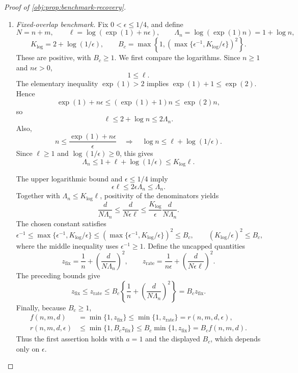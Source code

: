 \documentclass[11pt]{article}
\begin{document}
\begin{proof}[Proof of \cref{obj:prop:benchmark-recovery}]
\begin{enumerate}
\item \emph{Fixed-overlap benchmark.}
Fix \(0<\epsilon\le1/4\), and define
\[
N=n+m,\qquad
\ell=\log(\exp(1)+n\epsilon),\qquad
\Lambda_n=\log(\exp(1)n)=1+\log n,
\]
\[
K_{\log}=2+\log(1/\epsilon),
\qquad
B_c=\max\left\{1,
\left(\max\{\epsilon^{-1},K_{\log}/\epsilon\}\right)^2\right\}.
\]
These are positive, with \(B_c\ge1\). We first compare the logarithms. Since \(n\ge1\) and \(n\epsilon>0\),
\[
1\le\ell.
\]
The elementary inequality \(\exp(1)>2\) implies
\(\exp(1)+1\le\exp(2)\). Hence
\[
\exp(1)+n\epsilon
\le(\exp(1)+1)n
\le\exp(2)n,
\]
so
\[
\ell\le2+\log n\le2\Lambda_n.
\]
Also,
\[
n\le\frac{\exp(1)+n\epsilon}{\epsilon}
\quad\Longrightarrow\quad
\log n\le\ell+\log(1/\epsilon).
\]
Since \(\ell\ge1\) and \(\log(1/\epsilon)\ge0\), this gives
\[
\Lambda_n
\le1+\ell+\log(1/\epsilon)
\le K_{\log}\ell.
\]

The upper logarithmic bound and \(\epsilon\le1/4\) imply
\[
\epsilon\ell\le2\epsilon\Lambda_n\le\Lambda_n.
\]
Together with \(\Lambda_n\le K_{\log}\ell\), positivity of the denominators yields
\[
\frac d{N\Lambda_n}
\le\frac d{N\epsilon\ell}
\le\frac{K_{\log}}{\epsilon}\frac d{N\Lambda_n}.
\]
The chosen constant satisfies
\[
\epsilon^{-1}
\le\max\{\epsilon^{-1},K_{\log}/\epsilon\}
\le\left(\max\{\epsilon^{-1},K_{\log}/\epsilon\}\right)^2
\le B_c,
\qquad
(K_{\log}/\epsilon)^2\le B_c,
\]
where the middle inequality uses \(\epsilon^{-1}\ge1\). Define the uncapped quantities
\[
z_{\mathrm{fix}}
=\frac1n+\left(\frac d{N\Lambda_n}\right)^2,
\qquad
z_{\mathrm{rate}}
=\frac1{n\epsilon}+\left(\frac d{N\epsilon\ell}\right)^2.
\]
The preceding bounds give
\[
z_{\mathrm{fix}}\le z_{\mathrm{rate}}
\le
B_c\left\{\frac1n+\left(\frac d{N\Lambda_n}\right)^2\right\}
=B_cz_{\mathrm{fix}}.
\]
Finally, because \(B_c\ge1\),
\[
\begin{aligned}
f(n,m,d)
&=\min\{1,z_{\mathrm{fix}}\}
\le\min\{1,z_{\mathrm{rate}}\}
=r(n,m,d,\epsilon),\\
r(n,m,d,\epsilon)
&\le\min\{1,B_cz_{\mathrm{fix}}\}
\le B_c\min\{1,z_{\mathrm{fix}}\}
=B_cf(n,m,d).
\end{aligned}
\]
Thus the first assertion holds with \(a=1\) and the displayed \(B_c\), which depends only on \(\epsilon\).


\end{enumerate}
\end{proof}
\end{document}
